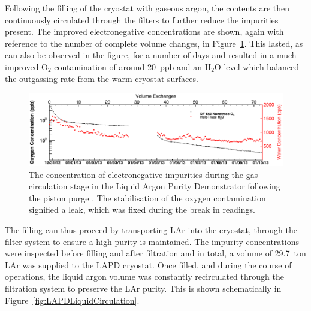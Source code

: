 Following the filling of the cryostat with gaseous argon, the contents are then continuously circulated through the filters to further reduce the impurities present.  The improved electronegative concentrations are shown, again with reference to the number of complete volume changes, in Figure~\ref{fig:LAPDGasCirculation}.  This lasted, as can also be observed in the figure, for a number of days and resulted in a much improved O$_2$ contamination of around 20~ppb and an H$_2$O level which balanced the outgassing rate from the warm cryostat surfaces.

\begin{figure}
  \centering
  \includegraphics[width=0.7\linewidth]{LAPDGasCirculation.pdf}
  \caption[The concentration of electronegative impurities during the gas circulation stage in the Liquid Argon Purity Demonstrator following the piston purge.]{The concentration of electronegative impurities during the gas circulation stage in the Liquid Argon Purity Demonstrator following the piston purge \cite{LAPDJINST2014}.  The stabilisation of the oxygen contamination signified a leak, which was fixed during the break in readings.}
  \label{fig:LAPDGasCirculation}
\end{figure}

The filling can thus proceed by transporting LAr into the cryostat, through the filter system to ensure a high purity is maintained.  The impurity concentrations were inspected before filling and after filtration and in total, a volume of 29.7~ton LAr was supplied to the LAPD cryostat.  Once filled, and during the course of operations, the liquid argon volume was constantly recirculated through the filtration system to preserve the LAr purity.  This is shown schematically in Figure~\ref{fig:LAPDLiquidCirculation}.

